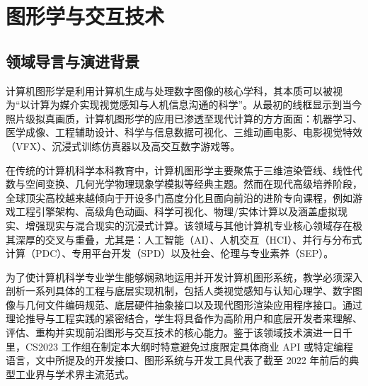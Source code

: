 \chapter{图形学与交互技术}

\section{领域导言与演进背景}

\begin{preamblebox}[知识领域概述与变革]
计算机图形学是利用计算机生成与处理数字图像的核心学科，其本质可以被视为“以计算为媒介实现视觉感知与人机信息沟通的科学”。从最初的线框显示到当今照片级拟真画质，计算机图形学的应用已渗透至现代计算的方方面面：机器学习、医学成像、工程辅助设计、科学与信息数据可视化、三维动画电影、电影视觉特效（VFX）、沉浸式训练仿真器以及高交互数字游戏等。

在传统的计算机科学本科教育中，计算机图形学主要聚焦于三维渲染管线、线性代数与空间变换、几何光学物理现象学模拟等经典主题。然而在现代高级培养阶段，全球顶尖高校越来越倾向于开设多门高度分化且面向前沿的进阶专向课程，例如游戏工程引擎架构、高级角色动画、科学可视化、物理/实体计算以及涵盖虚拟现实、增强现实与混合现实的沉浸式计算。该领域与其他计算机专业核心领域存在极其深厚的交叉与重叠，尤其是：人工智能（AI）、人机交互（HCI）、并行与分布式计算（PDC）、专用平台开发（SPD）以及社会、伦理与专业素养（SEP）。

为了使计算机科学专业学生能够娴熟地运用并开发计算机图形系统，教学必须深入剖析一系列具体的工程与底层实现机制，包括人类视觉感知与认知心理学、数字图像与几何文件编码规范、底层硬件抽象接口以及现代图形渲染应用程序接口。通过理论推导与工程实践的紧密结合，学生将具备作为高阶用户和底层开发者来理解、评估、重构并实现前沿图形与交互技术的核心能力。鉴于该领域技术演进一日千里，CS2023 工作组在制定本大纲时特意避免过度限定具体商业 API 或特定编程语言，文中所提及的开发接口、图形系统与开发工具代表了截至 2022 年前后的典型工业界与学术界主流范式。


\end{preamblebox}
